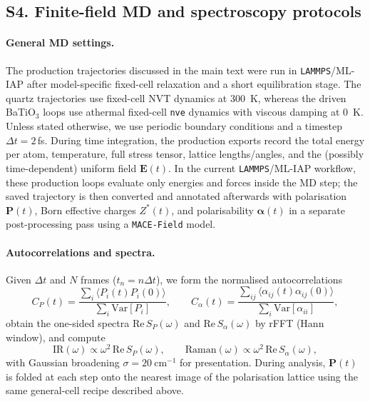 \documentclass[aps,physrev,graphicx,amsmath,amssymb,reprint]{revtex4-2} %
\begin{document}
\subsection*{S4. Finite-field MD and spectroscopy protocols}

\paragraph*{General MD settings.}
The production trajectories discussed in the main text were run in \texttt{LAMMPS}/ML-IAP after model-specific fixed-cell relaxation and a short equilibration stage. The quartz trajectories use fixed-cell NVT dynamics at 300~\si{K}, whereas the driven BaTiO$_3$ loops use athermal fixed-cell \texttt{nve} dynamics with viscous damping at 0~\si{K}. Unless stated otherwise, we use periodic boundary conditions and a timestep $\Delta t=2$\,fs. During time integration, the production exports record the total energy per atom, temperature, full stress tensor, lattice lengths/angles, and the (possibly time-dependent) uniform field $\mathbf E(t)$. In the current \texttt{LAMMPS}/ML-IAP workflow, these production loops evaluate only energies and forces inside the MD step; the saved trajectory is then converted and annotated afterwards with polarisation $\mathbf P(t)$, Born effective charges $Z^*(t)$, and polarisability $\boldsymbol\alpha(t)$ in a separate post-processing pass using a \texttt{MACE-Field} model.
\\

\paragraph*{Autocorrelations and spectra.}
Given $\Delta t$ and $N$ frames ($t_n=n\Delta t$), we form the normalised autocorrelations
\[
C_P(t)=\frac{\sum_i\langle P_i(t)P_i(0)\rangle}{\sum_i\mathrm{Var}[P_i]},\qquad
C_\alpha(t)=\frac{\sum_{ij}\langle \alpha_{ij}(t)\alpha_{ij}(0)\rangle}{\sum_i\mathrm{Var}[\alpha_{ii}]},
\]
obtain the one-sided spectra $\mathrm{Re}\,S_P(\omega)$ and $\mathrm{Re}\,S_\alpha(\omega)$ by rFFT (Hann window), and
compute
\[
\mathrm{IR}(\omega)\propto \omega^2\,\mathrm{Re}\,S_P(\omega),\qquad
\mathrm{Raman}(\omega)\propto \omega^2\,\mathrm{Re}\,S_\alpha(\omega),
\]
with Gaussian broadening $\sigma=20~\mathrm{cm}^{-1}$ for presentation. During analysis, $\mathbf P(t)$ is folded at each
step onto the nearest image of the polarisation lattice using the same general-cell recipe described above.
\\
\end{document}
